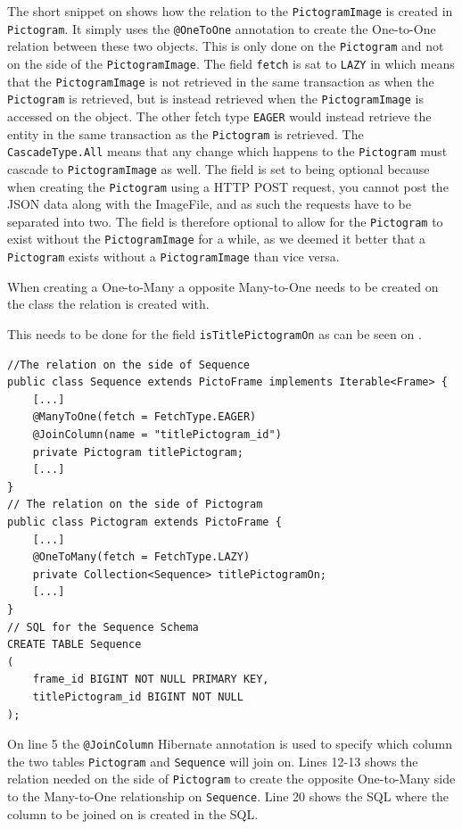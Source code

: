 The short snippet on  shows how the relation to the \texttt{PictogramImage} is created in \texttt{Pictogram}.
It simply uses the \texttt{@OneToOne} annotation to create the One-to-One relation between these two objects.
This is only done on the \texttt{Pictogram} and not on the side of the \texttt{PictogramImage}.
The field \texttt{fetch} is sat to \texttt{LAZY} in which means that the \texttt{PictogramImage} is not retrieved in the same transaction as when the \texttt{Pictogram} is retrieved, but is instead retrieved when the \texttt{PictogramImage} is accessed on the object.
The other fetch type \texttt{EAGER} would instead retrieve the entity in the same transaction as the \texttt{Pictogram} is retrieved.
The \texttt{CascadeType.All} means that any change which happens to the \texttt{Pictogram} must cascade to \texttt{PictogramImage} as well.
The field is set to being optional because when creating the \texttt{Pictogram} using a HTTP POST request, you cannot post the JSON data along with the ImageFile, and as such the requests have to be separated into two.
The field is therefore optional to allow for the \texttt{Pictogram} to exist without the \texttt{PictogramImage} for a while, as we deemed it better that a \texttt{Pictogram} exists without a \texttt{PictogramImage} than vice versa.

When creating a One-to-Many a opposite Many-to-One needs to be created on the class the relation is created with.

This needs to be done for the field \texttt{isTitlePictogramOn} as can be seen on .

\begin{lstlisting}[float, floatplacement=h, caption={Fields with annotations which causes Hibernate to perform the ORM for \texttt{titlePictogram}. \texttt{[...]} denotes omitted code.},label={lst:titlePictogram}]
//The relation on the side of Sequence
public class Sequence extends PictoFrame implements Iterable<Frame> {
	[...]
	@ManyToOne(fetch = FetchType.EAGER)
	@JoinColumn(name = "titlePictogram_id")
	private Pictogram titlePictogram;
	[...]
}
// The relation on the side of Pictogram
public class Pictogram extends PictoFrame {
	[...]
	@OneToMany(fetch = FetchType.LAZY)
	private Collection<Sequence> titlePictogramOn;
	[...]
}
// SQL for the Sequence Schema
CREATE TABLE Sequence
(
    frame_id BIGINT NOT NULL PRIMARY KEY,
    titlePictogram_id BIGINT NOT NULL
);
\end{lstlisting}

On line 5 the \texttt{@JoinColumn} Hibernate annotation is used to specify which column the two tables \texttt{Pictogram} and \texttt{Sequence} will join on.
Lines 12-13 shows the relation needed on the side of \texttt{Pictogram} to create the opposite One-to-Many side to the Many-to-One relationship on \texttt{Sequence}.
Line 20 shows the SQL where the column to be joined on is created in the SQL.

